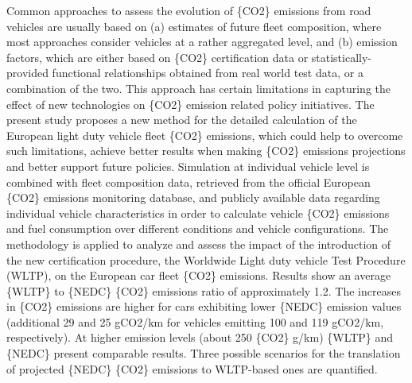 Common approaches to assess the evolution of \{CO2\} emissions from road vehicles are usually based on (a) estimates of future fleet composition, where most approaches consider vehicles at a rather aggregated level, and (b) emission factors, which are either based on \{CO2\} certification data or statistically-provided functional relationships obtained from real world test data, or a combination of the two. This approach has certain limitations in capturing the effect of new technologies on \{CO2\} emission related policy initiatives. The present study proposes a new method for the detailed calculation of the European light duty vehicle fleet \{CO2\} emissions, which could help to overcome such limitations, achieve better results when making \{CO2\} emissions projections and better support future policies. Simulation at individual vehicle level is combined with fleet composition data, retrieved from the official European \{CO2\} emissions monitoring database, and publicly available data regarding individual vehicle characteristics in order to calculate vehicle \{CO2\} emissions and fuel consumption over different conditions and vehicle configurations. The methodology is applied to analyze and assess the impact of the introduction of the new certification procedure, the Worldwide Light duty vehicle Test Procedure (WLTP), on the European car fleet \{CO2\} emissions. Results show an average \{WLTP\} to \{NEDC\} \{CO2\} emissions ratio of approximately 1.2. The increases in \{CO2\} emissions are higher for cars exhibiting lower \{NEDC\} emission values (additional 29 and 25 gCO2/km for vehicles emitting 100 and 119 gCO2/km, respectively). At higher emission levels (about 250 \{CO2\} g/km) \{WLTP\} and \{NEDC\} present comparable results. Three possible scenarios for the translation of projected \{NEDC\} \{CO2\} emissions to WLTP-based ones are quantified.